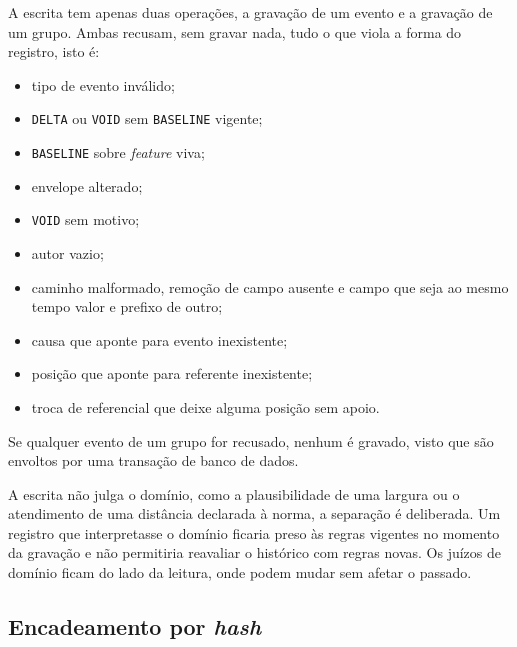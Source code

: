 A escrita tem apenas duas operações, a gravação de um evento e a gravação de um grupo. Ambas recusam, sem gravar nada, tudo o que viola a forma do registro, isto é:
\begin{itemize}
    \item tipo de evento inválido;
    \item \texttt{DELTA} ou \texttt{VOID} sem \texttt{BASELINE} vigente;
    \item \texttt{BASELINE} sobre \textit{feature} viva;
    \item envelope alterado;
    \item \texttt{VOID} sem motivo;
    \item autor vazio;
    \item caminho malformado, remoção de campo ausente e campo que seja ao mesmo tempo valor e prefixo de outro;
    \item causa que aponte para evento inexistente;
    \item posição que aponte para referente inexistente;
    \item troca de referencial que deixe alguma posição sem apoio.
\end{itemize}
Se qualquer evento de um grupo for recusado, nenhum é gravado, visto que são envoltos por uma transação de banco de dados.

A escrita não julga o domínio, como a plausibilidade de uma largura ou o atendimento de uma distância declarada à norma, a separação é deliberada. Um registro que interpretasse o domínio ficaria preso às regras vigentes no momento da gravação e não permitiria reavaliar o histórico com regras novas. Os juízos de domínio ficam do lado da leitura, onde podem mudar sem afetar o passado.

\subsection{Encadeamento por \textit{hash}}

